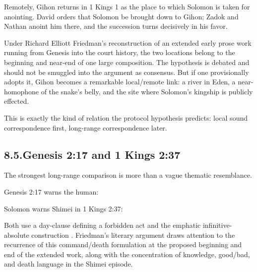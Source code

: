 Remotely, Gihon returns in 1 Kings 1 as the place to which Solomon is taken for anointing.  David orders that Solomon be brought down to Gihon; Zadok and Nathan anoint him there, and the succession turns decisively in his favor.\cite{Friedman1998}

Under Richard Elliott Friedman's reconstruction of an extended early prose work running from Genesis into the court history, the two locations belong to the beginning and near-end of one large composition.\cite{Friedman1998}  The hypothesis is debated and should not be smuggled into the argument as consensus.  But if one provisionally adopts it, Gihon becomes a remarkable local/remote link: a river in Eden, a near-homophone of the snake's belly, and the site where Solomon's kingship is publicly effected.

This is exactly the kind of relation the protocol hypothesis predicts: local sound correspondence first, long-range correspondence later.

\subsection*{8.5.\quad Genesis 2:17 and 1 Kings 2:37}

The strongest long-range comparison is more than a vague thematic resemblance.

Genesis 2:17 warns the human:


Solomon warns Shimei in 1 Kings 2:37:


Both use a day-clause defining a forbidden act and the emphatic infinitive-absolute construction .  Friedman's literary argument draws attention to the recurrence of this command/death formulation at the proposed beginning and end of the extended work, along with the concentration of knowledge, good/bad, and death language in the Shimei episode.\cite{Friedman1998}

